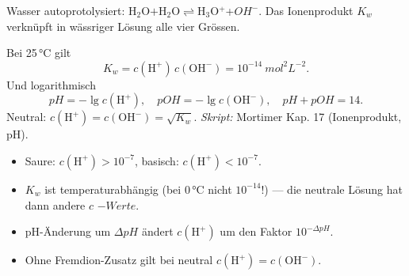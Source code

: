 

Wasser autoprotolysiert: H$_2$O$+$H$_2$O$\rightleftharpoons$H$_3$O$^+$+$OH^-$.
Das Ionenprodukt $K_w$ verknüpft in wässriger Lösung alle vier Grössen.

\begin{werkzeugkasten}
Bei 25\,°C gilt
\[
  K_w = c(\mathrm{H^+})\,c(\mathrm{OH^-}) = 10^{-14}\ mol^2L^{-2}.
\]
Und logarithmisch
\[
  pH = -\lg c(\mathrm{H^+}),\quad pOH = -\lg c(\mathrm{OH^-}),\quad
  pH + pOH = 14 .
\]
Neutral: $c(\mathrm{H^+}) = c(\mathrm{OH^-}) = \sqrt{K_w}$.
\textit{Skript:} Mortimer Kap. 17 (Ionenprodukt, pH).
\end{werkzeugkasten}

\begin{achtung}
\begin{itemize}
  \item Saure: $c(\mathrm{H^+})>10^{-7}$, basisch: $c(\mathrm{H^+})<10^{-7}$.
  \item $K_w$ ist temperaturabhängig (bei 0\,°C nicht $10^{-14}$!) --- die
        neutrale Lösung hat dann andere $c$ $-Werte$.
  \item pH-Änderung um $\Delta pH$ ändert $c(\mathrm{H^+})$ um den Faktor
        $10^{-\Delta pH}$.
  \item Ohne Fremdion-Zusatz gilt bei neutral $c(\mathrm{H^+})=c(\mathrm{OH^-})$.
\end{itemize}
\end{achtung}
